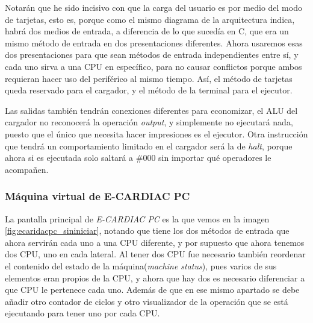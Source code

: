 \documentclass[letterpaper,12pt,oneside]{book}
\begin{document}
            Notarán que he sido incisivo con que la carga del usuario es por medio del modo
			de tarjetas, esto es, porque como el mismo diagrama de la arquitectura indica, habrá dos medios de entrada, a diferencia de lo que sucedía
			en C, que era un mismo método de entrada  en dos presentaciones diferentes. Ahora usaremos esas dos presentaciones para que sean métodos
			de entrada independientes entre sí, y cada uno sirva a una CPU en específico, para no causar conflictos porque ambos requieran hacer
			uso del periférico al mismo tiempo. Así, el método de tarjetas queda reservado para el cargador, y el método de la terminal para el ejecutor.

            Las salidas también tendrán conexiones diferentes para economizar,
            el ALU del cargador no reconocerá la operación \textit{output}, y simplemente
			no ejecutará nada, puesto que el único que necesita hacer impresiones es el ejecutor. Otra instrucción que tendrá un comportamiento limitado en el cargador será la de \textit{halt}, porque ahora si es ejecutada solo saltará a \#000 sin importar
			qué operadores le acompañen.
			

			
			\subsubsection{Máquina virtual de E-CARDIAC PC}
			
			La pantalla principal de \textit{E-CARDIAC PC} es la que vemos en la imagen \ref{fig:ecaridacpc_sininiciar}, notando que tiene los dos métodos
			de entrada que ahora servirán cada uno a una CPU diferente, y por supuesto que ahora tenemos dos CPU, uno en cada lateral. Al tener dos CPU fue necesario
			también reordenar el contenido del estado de la máquina(\textit{machine status}), pues varios de sus elementos eran propios de la CPU, y ahora que hay dos es necesario
			diferenciar a que CPU le pertenece cada uno. Además de que en ese mismo apartado se debe añadir otro contador de ciclos y otro
			visualizador de la operación que se está ejecutando para tener uno por cada CPU.
			
\end{document}
